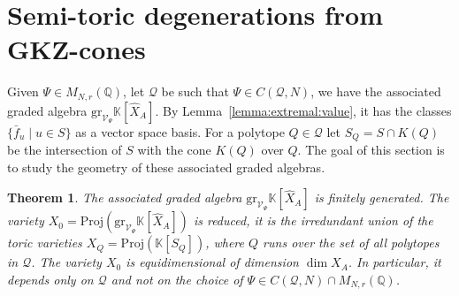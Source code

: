 \documentclass[12pt, a4article]{amsart}   	%
\numberwithin{equation}{section}
\theoremstyle{plain}
\newtheorem{theorem}{Theorem}[section]
\theoremstyle{definition}
\newtheorem{example}[theorem]{Example}
\newtheorem{definition}[theorem]{Definition}
\begin{document}


\section{Semi-toric degenerations from GKZ-cones}\label{two:graded:algebras}

Given $\Psi\in M_{N,r}(\mathbb Q)$, let $\mathcal Q$ be such that $\Psi\in C(\mathcal Q,N)$, we have the associated graded algebra $\mathrm{gr}_{\mathcal V_\Psi} \mathbb K[\hat X_A]$. By Lemma~\ref{lemma:extremal:value}, it has the classes $\{\bar f_u\mid u\in S\}$ as a vector space basis. For a polytope $Q\in\mathcal Q$ let $S_Q=S\cap K(Q)$ be the intersection of $S$ with the cone $K(Q)$ over $Q$. The goal of this section is to study the geometry of these associated graded algebras.

\begin{theorem}\label{coro:geometric1}
The associated graded algebra $\mathrm{gr}_{\mathcal V_\Psi}\mathbb K[\hat X_A]$ is finitely generated. The variety $X_0=\mathrm{Proj} (\mathrm{gr}_{\mathcal V_\Psi}\mathbb K[\hat X_A])$ is reduced, it is the irredundant union of the toric varieties $X_Q=\mathrm{Proj}(\mathbb K[S_Q])$, where $Q$ runs over the set of all polytopes  in $\mathcal Q$. The variety $X_0$ is equidimensional of dimension $\dim X_A$. In particular, it depends only on $\mathcal Q$ and not on the choice of $\Psi\in C(\mathcal Q,N)\cap M_{N,r}(\mathbb{Q})$.
\end{theorem}
\end{document}
